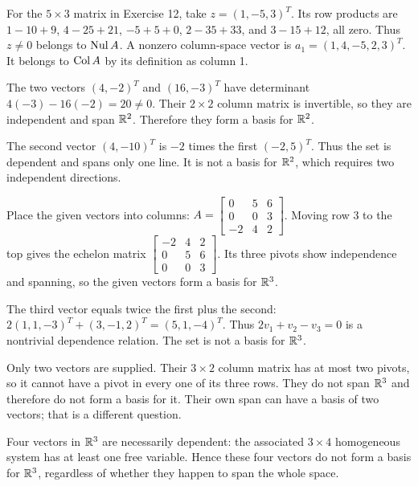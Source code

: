 For the $5\times3$ matrix in Exercise 12, take
$z=(1,-5,3)^T$. Its row products are
$1-10+9$, $4-25+21$, $-5+5+0$, $2-35+33$, and $3-15+12$,
all zero. Thus $z\ne0$ belongs to $\operatorname{Nul} A$.
A nonzero column-space vector is $a_1=(1,4,-5,2,3)^T$.
It belongs to $\operatorname{Col} A$ by its definition as column 1.

The two vectors $(4,-2)^T$ and $(16,-3)^T$ have determinant
$4(-3)-16(-2)=20\ne0$. Their $2\times2$ column matrix is invertible,
so they are independent and span $\mathbb{R}^2$. Therefore they form a basis
for $\mathbb{R}^2$.

The second vector $(4,-10)^T$ is $-2$ times the first $(-2,5)^T$.
Thus the set is dependent and spans only one line. It is not a basis for
$\mathbb{R}^2$, which requires two independent directions.

Place the given vectors into columns:
$A=\begin{bmatrix}0&5&6\\0&0&3\\-2&4&2\end{bmatrix}$.
Moving row 3 to the top gives the echelon matrix
$\begin{bmatrix}-2&4&2\\0&5&6\\0&0&3\end{bmatrix}$.
Its three pivots show independence and spanning, so the given vectors
form a basis for $\mathbb{R}^3$.

The third vector equals twice the first plus the second:
$2(1,1,-3)^T+(3,-1,2)^T=(5,1,-4)^T$.
Thus $2v_1+v_2-v_3=0$ is a nontrivial dependence relation.
The set is not a basis for $\mathbb{R}^3$.

Only two vectors are supplied. Their $3\times2$ column matrix has at most
two pivots, so it cannot have a pivot in every one of its three rows.
They do not span $\mathbb{R}^3$ and therefore do not form a basis for it.
Their own span can have a basis of two vectors; that is a different question.

Four vectors in $\mathbb{R}^3$ are necessarily dependent: the associated
$3\times4$ homogeneous system has at least one free variable.
Hence these four vectors do not form a basis for $\mathbb{R}^3$, regardless
of whether they happen to span the whole space.

